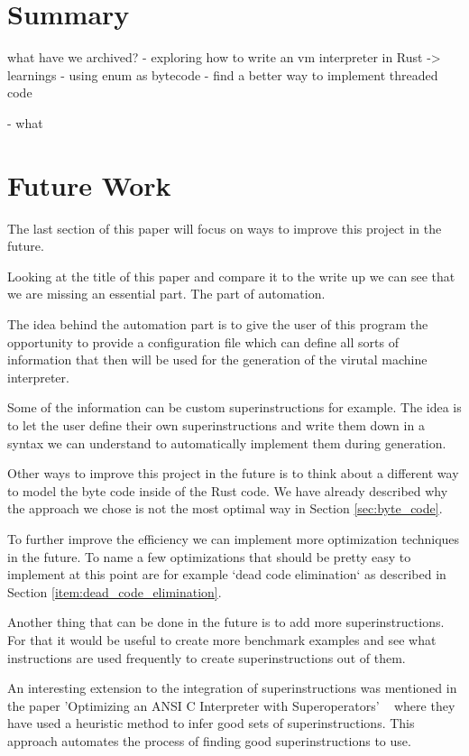 \documentclass{article}
\begin{document}
\section{Summary}
what have we archived?
- exploring how to write an vm interpreter in Rust
    -> learnings
        - using enum as bytecode
        - find a better way to implement threaded code

- what 


\section{Future Work}
The last section of this paper will focus on ways to improve this project
in the future.

Looking at the title of this paper and compare it to the write up we can see
that we are missing an essential part. The part of automation.

The idea behind the automation part is to give the user of this program
the opportunity to provide a configuration file which can define all 
sorts of information that then will be used for the generation of the
virutal machine interpreter.

Some of the information can be custom superinstructions for example. The idea
is to let the user define their own superinstructions and write them down in a
syntax we can understand to automatically implement them during generation.

Other ways to improve this project in the future is to think about a different
way to model the byte code inside of the Rust code. We have already described
why the approach we chose is not the most optimal way in Section
\ref{sec:byte_code}.

To further improve the efficiency we can implement more optimization techniques
in the future. To name a few optimizations that should be pretty easy to
implement at this point are for example `dead code elimination` as described in
Section \ref{item:dead_code_elimination}.

Another thing that can be done in the future is to add more superinstructions.
For that it would be useful to create more benchmark examples and see what
instructions are used frequently to create superinstructions out of them.

An interesting extension to the integration of superinstructions was mentioned
in the paper 'Optimizing an ANSI C Interpreter with Superoperators'
~\cite{superoperators} where they have used a heuristic method to infer good
sets of superinstructions. This approach automates the process of finding good
superinstructions to use.

\clearpage


\end{document}
